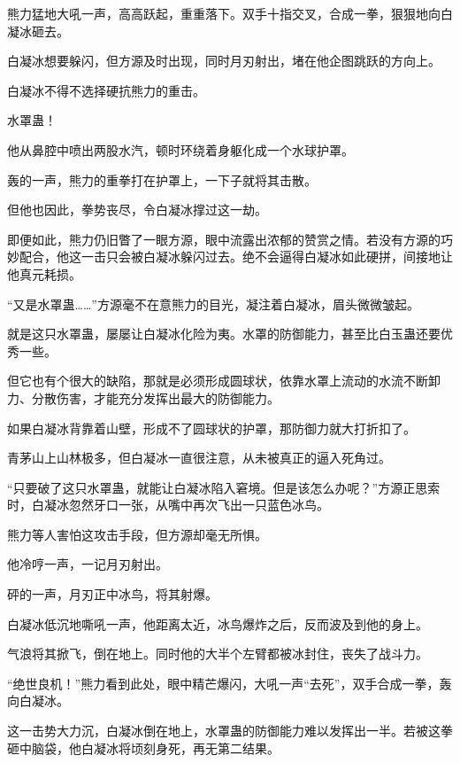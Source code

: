\begin{this_body}
熊力猛地大吼一声，高高跃起，重重落下。双手十指交叉，合成一拳，狠狠地向白凝冰砸去。

白凝冰想要躲闪，但方源及时出现，同时月刃射出，堵在他企图跳跃的方向上。

白凝冰不得不选择硬抗熊力的重击。

水罩蛊！

他从鼻腔中喷出两股水汽，顿时环绕着身躯化成一个水球护罩。

轰的一声，熊力的重拳打在护罩上，一下子就将其击散。

但他也因此，拳势丧尽，令白凝冰撑过这一劫。

即便如此，熊力仍旧瞥了一眼方源，眼中流露出浓郁的赞赏之情。若没有方源的巧妙配合，他这一击只会被白凝冰躲闪过去。绝不会逼得白凝冰如此硬拼，间接地让他真元耗损。

“又是水罩蛊……”方源毫不在意熊力的目光，凝注着白凝冰，眉头微微皱起。

就是这只水罩蛊，屡屡让白凝冰化险为夷。水罩的防御能力，甚至比白玉蛊还要优秀一些。

但它也有个很大的缺陷，那就是必须形成圆球状，依靠水罩上流动的水流不断卸力、分散伤害，才能充分发挥出最大的防御能力。

如果白凝冰背靠着山壁，形成不了圆球状的护罩，那防御力就大打折扣了。

青茅山上山林极多，但白凝冰一直很注意，从未被真正的逼入死角过。

“只要破了这只水罩蛊，就能让白凝冰陷入窘境。但是该怎么办呢？”方源正思索时，白凝冰忽然牙口一张，从嘴中再次飞出一只蓝色冰鸟。

熊力等人害怕这攻击手段，但方源却毫无所惧。

他冷哼一声，一记月刃射出。

砰的一声，月刃正中冰鸟，将其射爆。

白凝冰低沉地嘶吼一声，他距离太近，冰鸟爆炸之后，反而波及到他的身上。

气浪将其掀飞，倒在地上。同时他的大半个左臂都被冰封住，丧失了战斗力。

“绝世良机！”熊力看到此处，眼中精芒爆闪，大吼一声“去死”，双手合成一拳，轰向白凝冰。

这一击势大力沉，白凝冰倒在地上，水罩蛊的防御能力难以发挥出一半。若被这拳砸中脑袋，他白凝冰将顷刻身死，再无第二结果。

\end{this_body}

